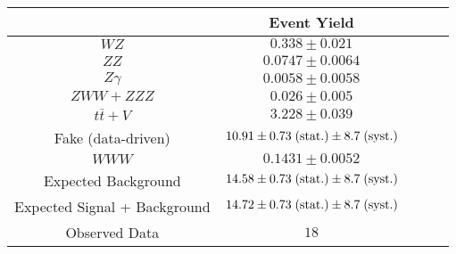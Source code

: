 \begin{tabular}{|c||c|c|c|c|}
\hline
 & Event Yield\\ 
\hline\hline
$WZ$ &  $0.338 \pm 0.021$\\ 
$ZZ$ &  $0.0747 \pm 0.0064$\\ 
$Z\gamma$ &  $0.0058 \pm 0.0058$\\ 
$ZWW+ZZZ$ &  $0.026 \pm 0.005$\\ 
$t\bar{t}+V$ &  $3.228 \pm 0.039$\\ 
Fake (data-driven) &  $10.91 \pm 0.73 \mbox{$\;$(stat.)} \pm 8.7 \mbox{$\;$(syst.)}$\\ 
$WWW$ &  $0.1431 \pm 0.0052$\\ 
\hline
Expected Background &  $14.58 \pm 0.73 \mbox{$\;$(stat.)} \pm 8.7 \mbox{$\;$(syst.)}$\\ 
Expected Signal + Background &  $14.72 \pm 0.73 \mbox{$\;$(stat.)} \pm 8.7 \mbox{$\;$(syst.)}$\\ 
\hline
Observed Data &  $18$\\ 
\hline
\end{tabular}
